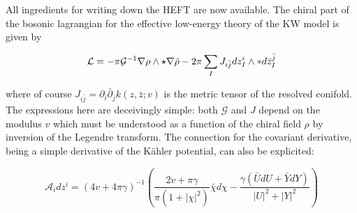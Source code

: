 All ingredients for writing down the HEFT are now available. The chiral part of the bosonic lagrangian for the effective low-energy theory of the KW model is given by

\begin{equation}
	\mathcal{L} = - \pi \mathcal{G}^{-1} \nabla \rho \wedge \star \nabla \bar \rho - 2\pi \sum_I J_{i\bar j} dz_I^i \wedge \ast d\bar z_I^{\bar j} 
	\label{}
\end{equation}

where of course $J_{i\bar j} = \partial_i \bar \partial_j k(z,\bar z; v)$ is the metric tensor of the resolved conifold. The expressions here are deceivingly simple: both $\mathcal{G}$ and $J$ depend on the modulus $v$ which must be understood as a function of the chiral field $\rho$ by inversion of the Legendre transform. The connection for the covariant derivative, being a simple derivative of the K\"ahler potential, can also be explicited:

\begin{equation}
	\mathcal{A}_i dz^i = (4v + 4\pi \gamma)^{-1} \left( \frac{2v + \pi\gamma}{\pi(1+|\chi|^2)}\bar\chi d\chi - \frac{\gamma\left( \bar U dU + \bar Y dY \right)}{|U|^2 + |Y|^2} \right)
	\label{}
\end{equation}

